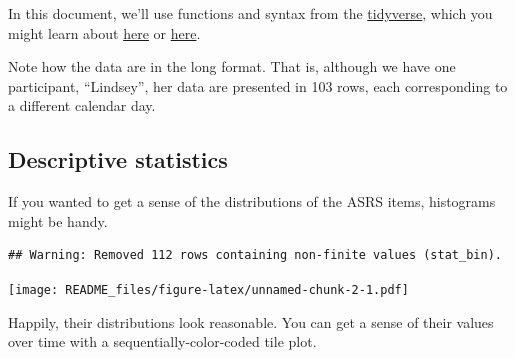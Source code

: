 \documentclass[]{article}
\newenvironment{Shaded}{\begin{snugshade}}{\end{snugshade}}
\newcommand{\KeywordTok}[1]{\textcolor[rgb]{0.13,0.29,0.53}{\textbf{#1}}}
\newcommand{\DataTypeTok}[1]{\textcolor[rgb]{0.13,0.29,0.53}{#1}}
\newcommand{\DecValTok}[1]{\textcolor[rgb]{0.00,0.00,0.81}{#1}}
\newcommand{\StringTok}[1]{\textcolor[rgb]{0.31,0.60,0.02}{#1}}
\newcommand{\OperatorTok}[1]{\textcolor[rgb]{0.81,0.36,0.00}{\textbf{#1}}}
\newcommand{\NormalTok}[1]{#1}
\begin{document}
In this document, we'll use functions and syntax from the
\href{https://www.tidyverse.org}{tidyverse}, which you might learn about
\href{http://r4ds.had.co.nz/transform.html}{here} or
\href{http://style.tidyverse.org}{here}.

Note how the data are in the long format. That is, although we have one
participant, ``Lindsey'', her data are presented in 103 rows, each
corresponding to a different calendar day.

\subsection{Descriptive statistics}\label{descriptive-statistics}

If you wanted to get a sense of the distributions of the ASRS items,
histograms might be handy.

\begin{Shaded}
\end{Shaded}

\begin{verbatim}
## Warning: Removed 112 rows containing non-finite values (stat_bin).
\end{verbatim}

\texttt{[image: README\_files/figure-latex/unnamed-chunk-2-1.pdf]}

Happily, their distributions look reasonable. You can get a sense of
their values over time with a sequentially-color-coded tile plot.
\end{document}
